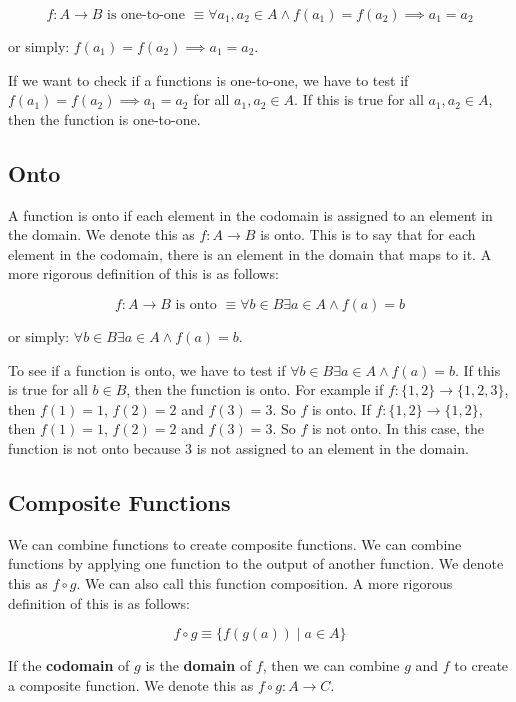 \documentclass[11pt]{article}
\begin{document}
\[
f: A \rightarrow B \text{ is one-to-one } \equiv \forall a_1, a_2 \in A \land f(a_1) = f(a_2) \implies a_1 = a_2
\]

or simply: \(f(a_1) = f(a_2) \implies a_1 = a_2\).

If we want to check if a functions is one-to-one, we have to test if \(f(a_1) = f(a_2) \implies a_1 = a_2\) for all \(a_1, a_2 \in A\). If this is true for all \(a_1, a_2 \in A\), then the function is one-to-one.


\subsection{Onto}
\label{sec:org59c620f}
A function is onto if each element in the codomain is assigned to an element in the domain. We denote this as \(f: A \rightarrow B\) is onto. This is to say that for each element in the codomain, there is an element in the domain that maps to it. A more rigorous definition of this is as follows:

\[
f: A \rightarrow B \text{ is onto } \equiv \forall b \in B \exists a \in A \land f(a) = b
\]

or simply: \(\forall b \in B \exists a \in A \land f(a) = b\).

To see if a function is onto, we have to test if \(\forall b \in B \exists a \in A \land f(a) = b\). If this is true for all \(b \in B\), then the function is onto. For example if \(f: \{1,2\} \rightarrow \{1,2,3\}\), then \(f(1) = 1\), \(f(2) = 2\) and \(f(3) = 3\). So \(f\) is onto. If \(f: \{1,2\} \rightarrow \{1,2\}\), then \(f(1) = 1\), \(f(2) = 2\) and \(f(3) = 3\). So \(f\) is not onto. In this case, the function is not onto because \(3\) is not assigned to an element in the domain.

\subsection{Composite Functions}
\label{sec:org55692ae}
We can combine functions to create composite functions. We can combine functions by applying one function to the output of another function. We denote this as \(f \circ g\). We can also call this function composition. A more rigorous definition of this is as follows:

\[
f \circ g \equiv \{f(g(a)) \mid a \in A\}
\]

If the \textbf{codomain} of \(g\) is the \textbf{domain} of \(f\), then we can combine \(g\) and \(f\) to create a composite function. We denote this as \(f \circ g: A \rightarrow C\).
\end{document}
